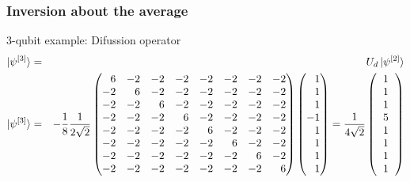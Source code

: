 \begin{frame}
	\frametitle{Inversion about the average}
	\begin{exampleblock}{3-qubit example: Difussion operator}
	\begin{eqnarray}
	\ket{\psi^{[3]}}&=&U_d\ket{\psi^{[2]}}\nonumber\\
	\ket{\psi^{[3]}} &=& -\frac{1}{8}\frac{1}{2\sqrt{2}}\begin{pmatrix*}[r]
	6 & -2 & -2 & -2 & -2 & -2 & -2 & -2\\
	-2 & 6 & -2 & -2 & -2 & -2 & -2 & -2\\
	-2 & -2 & 6 & -2 & -2 & -2 & -2 & -2\\
	-2 & -2 & -2 & 6 & -2 & -2 & -2 & -2\\
	-2 & -2 & -2 & -2 & 6 & -2 & -2 & -2\\
	-2 & -2 & -2 & -2 & -2 & 6 & -2 & -2\\
	-2 & -2 & -2 & -2 & -2 & -2 & 6 & -2\\
	-2 & -2 & -2 & -2 & -2 & -2 & -2 & 6
	\end{pmatrix*}
		\begin{pmatrix*}[r]
		1\\
		1\\
		1\\
		-1\\
		1\\
		1\\
		1\\
		1
		\end{pmatrix*}=\frac{1}{4\sqrt{2}}
		\left(
		\begin{tabular}{c}
		1\\
		1\\
		1\\
		5\\
		1\\
		1\\
		1\\
		1
		\end{tabular}
		\right)\nonumber
	\end{eqnarray}
	\end{exampleblock}
\end{frame}